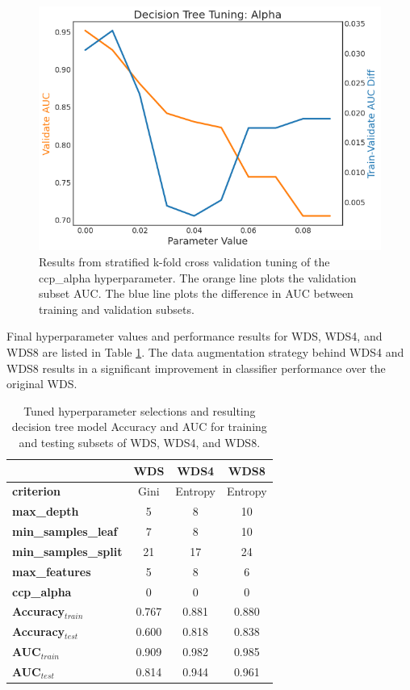 \begin{figure}[!htp]
\centering
\includegraphics[width=.6\textwidth]{templates/images/Figure-DT_tuning_alpha.png}
\caption[Decision tree alpha tuning]{Results from stratified k-fold cross validation tuning of the ccp\_alpha hyperparameter. The orange line plots the validation subset AUC. The blue line plots the difference in AUC between training and validation subsets.}
\label{fig:dtree_alpha}
\end{figure}

Final hyperparameter values and performance results for WDS, WDS4, and WDS8 are listed in Table \ref{tab:dtree_tuning}. The data augmentation strategy behind WDS4 and WDS8 results in a significant improvement in classifier performance over the original WDS.

\begin{table}[!htp]
\centering
\begin{tabular}{l|c|c|c|}
\cline{2-4}
                                          & \textbf{WDS} & \textbf{WDS4} & \textbf{WDS8} \\ \hline
\multicolumn{1}{|l|}{\textbf{criterion}}           & Gini & Entropy & Entropy \\ \hline
\multicolumn{1}{|l|}{\textbf{max\_depth}}          & 5    & 8    & 10   \\ \hline
\multicolumn{1}{|l|}{\textbf{min\_samples\_leaf}}  & 7    & 8    & 10   \\ \hline
\multicolumn{1}{|l|}{\textbf{min\_samples\_split}} & 21   & 17   & 24   \\ \hline
\multicolumn{1}{|l|}{\textbf{max\_features}}       & 5    & 8    & 6    \\ \hline
\multicolumn{1}{|l|}{\textbf{ccp\_alpha}}          & 0    & 0    & 0    \\ \hline
\multicolumn{1}{|l|}{\textbf{Accuracy$_{train}$}}  & 0.767 & 0.881 & 0.880 \\ \hline
\multicolumn{1}{|l|}{\textbf{Accuracy$_{test}$}}   & 0.600 & 0.818 & 0.838 \\ \hline
\multicolumn{1}{|l|}{\textbf{AUC$_{train}$}}       & 0.909 & 0.982 & 0.985 \\ \hline
\multicolumn{1}{|l|}{\textbf{AUC$_{test}$}}        & 0.814 & 0.944 & 0.961 \\ \hline
\end{tabular}
\caption[Decision tree hyperparameter tuning results]{Tuned hyperparameter selections and resulting decision tree model Accuracy and AUC for training and testing subsets of WDS, WDS4, and WDS8.}
\label{tab:dtree_tuning}
\end{table}

